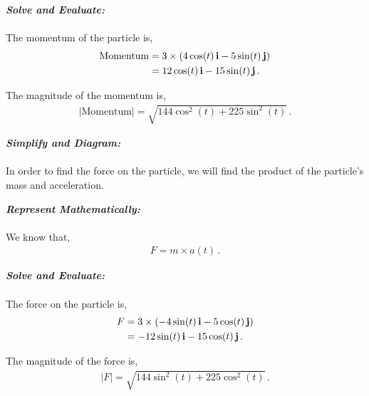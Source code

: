 \begin{subquestions}
\begin{subsubquestions}
\textbf{\textit{Solve and Evaluate:}} \\ \\
The momentum of the particle is,
\begin{align}
	\text{Momentum} & = 3 \times \left(4\cos(t) \,\mathbf{i} -5\sin(t) \,\mathbf{j}\right) \nonumber \\
	                & = 12\cos(t) \,\mathbf{i} - 15\sin(t)\,\mathbf{j} \,.
\end{align}

The magnitude of the momentum is,
\begin{align}
	|\text{Momentum}| = \sqrt{144\cos^2(t)+225\sin^2(t)} \,.	
\end{align}


\subsubquestion

\textbf{\textit{Simplify and Diagram:}} \\ \\
In order to find the force on the particle, we will find the product of the particle's mass and acceleration.




\textbf{\textit{Represent Mathematically:}} \\ \\
We know that,
\begin{align}
	F = m \times a(t) \,.
\end{align}




\textbf{\textit{Solve and Evaluate:}} \\ \\
The force on the particle is,
\begin{align}
	F & = 3 \times \left(-4\sin(t)\,\mathbf{i} - 5\cos(t)\,\mathbf{j}\right) \nonumber \\
	& = -12\sin(t) \,\mathbf{i} - 15\cos(t)\,\mathbf{j} \,.
\end{align}

The magnitude of the force is,
\begin{align}
	|F| = \sqrt{144\sin^2(t)+225\cos^2(t)} \,.	
\end{align}

\end{subsubquestions}

\end{subquestions}